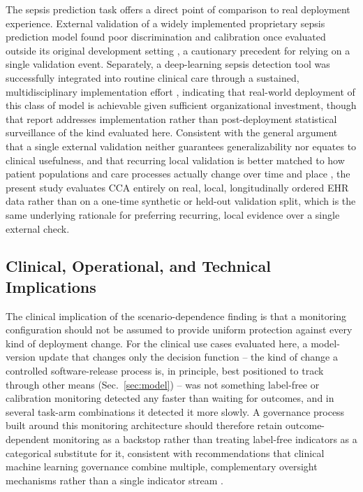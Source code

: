 \documentclass[apajournal,article,submit,oneauthor]{Definitions/mdpi}
\begin{document}
The sepsis prediction task offers a direct point of comparison to real deployment experience. External validation of a widely implemented proprietary sepsis prediction model found poor discrimination and calibration once evaluated outside its original development setting \citep{wong2021}, a cautionary precedent for relying on a single validation event. Separately, a deep-learning sepsis detection tool was successfully integrated into routine clinical care through a sustained, multidisciplinary implementation effort \citep{sendak2020}, indicating that real-world deployment of this class of model is achievable given sufficient organizational investment, though that report addresses implementation rather than post-deployment statistical surveillance of the kind evaluated here. Consistent with the general argument that a single external validation neither guarantees generalizability nor equates to clinical usefulness, and that recurring local validation is better matched to how patient populations and care processes actually change over time and place \citep{youssef2023}, the present study evaluates CCA entirely on real, local, longitudinally ordered EHR data rather than on a one-time synthetic or held-out validation split, which is the same underlying rationale for preferring recurring, local evidence over a single external check.

\subsection{Clinical, Operational, and Technical Implications}\label{sec:disc-implications}

The clinical implication of the scenario-dependence finding is that a monitoring configuration should not be assumed to provide uniform protection against every kind of deployment change. For the clinical use cases evaluated here, a model-version update that changes only the decision function -- the kind of change a controlled software-release process is, in principle, best positioned to track through other means (Sec.~\ref{sec:model}) -- was not something label-free or calibration monitoring detected any faster than waiting for outcomes, and in several task-arm combinations it detected it more slowly. A governance process built around this monitoring architecture should therefore retain outcome-dependent monitoring as a backstop rather than treating label-free indicators as a categorical substitute for it, consistent with recommendations that clinical machine learning governance combine multiple, complementary oversight mechanisms rather than a single indicator stream \citep{finlayson2021,nist2023}.
\end{document}
